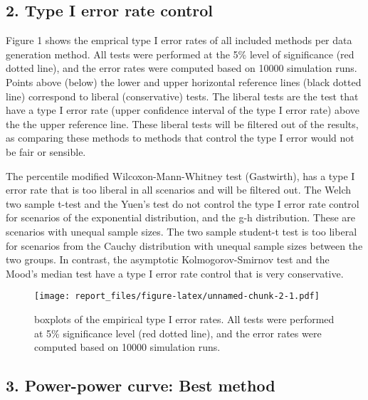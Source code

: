 \documentclass[
]{article}
\begin{document}
\hypertarget{type-i-error-rate-control}{%
\subsection{2. Type I error rate
control}\label{type-i-error-rate-control}}

Figure 1 shows the emprical type I error rates of all included methods
per data generation method. All tests were performed at the 5\% level of
significance (red dotted line), and the error rates were computed based
on 10000 simulation runs. Points above (below) the lower and upper
horizontal reference lines (black dotted line) correspond to liberal
(conservative) tests. The liberal tests are the test that have a type I
error rate (upper confidence interval of the type I error rate) above
the the upper reference line. These liberal tests will be filtered out
of the results, as comparing these methods to methods that control the
type I error would not be fair or sensible.

The percentile modified Wilcoxon-Mann-Whitney test (Gastwirth), has a
type I error rate that is too liberal in all scenarios and will be
filtered out. The Welch two sample t-test and the Yuen's test do not
control the type I error rate control for scenarios of the exponential
distribution, and the g-h distribution. These are scenarios with unequal
sample sizes. The two sample student-t test is too liberal for scenarios
from the Cauchy distribution with unequal sample sizes between the two
groups. In contrast, the asymptotic Kolmogorov-Smirnov test and the
Mood's median test have a type I error rate control that is very
conservative.

\begin{figure}
\centering
\texttt{[image: report\_files/figure-latex/unnamed-chunk-2-1.pdf]}
\caption{boxplots of the empirical type I error rates. All tests were
performed at 5\% significance level (red dotted line), and the error
rates were computed based on 10000 simulation runs.}
\end{figure}

\hypertarget{power-power-curve-best-method}{%
\subsection{3. Power-power curve: Best
method}\label{power-power-curve-best-method}}
\end{document}
